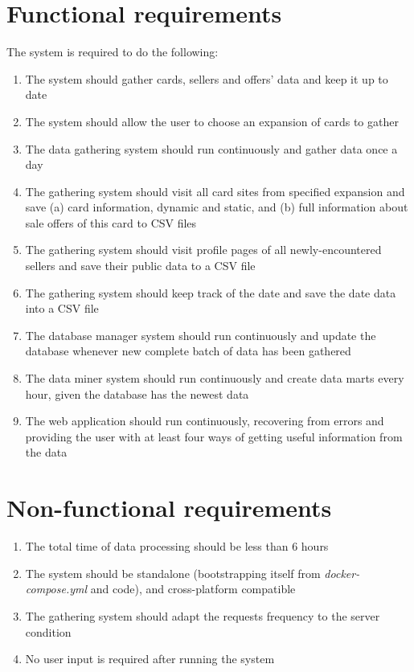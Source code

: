 \section{Functional requirements}
\label{s:functional_req}
The system is required to do the following:
\begin{enumerate}
    \item The system should gather cards, sellers and offers' data and keep it up to date
    \item The system should allow the user to choose an expansion of cards to gather
    \item The data gathering system should run continuously and gather data once a day
    \item The gathering system should visit all card sites from specified expansion and save (a) card information, dynamic and static, and (b) full information about sale offers of this card to CSV files
    \item The gathering system should visit profile pages of all newly-encountered sellers and save their public data to a CSV file
    \item The gathering system should keep track of the date and save the date data into a CSV file
    \item The database manager system should run continuously and update the database whenever new complete batch of data has been gathered
    \item The data miner system should run continuously and create data marts every hour, given the database has the newest data
    \item The web application should run continuously, recovering from errors and providing the user with at least four ways of getting useful information from the data
\end{enumerate}


\section{Non-functional requirements}
\label{s:nonfunctional_req}
\begin{enumerate}
    \item The total time of data processing should be less than 6 hours
    \item The system should be standalone (bootstrapping itself from \textit{docker-compose.yml} and code), and cross-platform compatible
    \item The gathering system should adapt the requests frequency to the server condition
    \item No user input is required after running the system
\end{enumerate}


